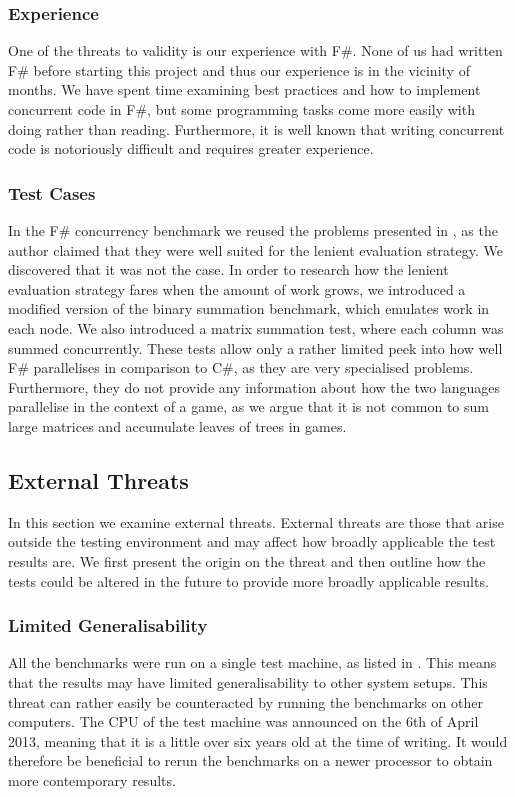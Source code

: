 \subsubsection{Experience}
One of the threats to validity is our experience with F\#. None of us had written F\# before starting this project and thus our experience is in the vicinity of months. We have spent time examining best practices and how to implement concurrent code in F\#, but some programming tasks come more easily with doing rather than reading. Furthermore, it is well known that writing concurrent code is notoriously difficult and requires greater experience\cite{nanz2013benchmarking,nanz2013examining}. 

\subsubsection{Test Cases}
In the F\# concurrency benchmark we reused the problems presented in \cite{DBLP:journals/cl/Tremblay-parallel}, as the author claimed that they were well suited for the lenient evaluation strategy. We discovered that it was not the case. In order to research how the lenient evaluation strategy fares when the amount of work grows, we introduced a modified version of the binary summation benchmark, which emulates work in each node. We also introduced a matrix summation test, where each column was summed concurrently. These tests allow only a rather limited peek into how well F\# parallelises in comparison to C\#, as they are very specialised problems. Furthermore, they do not provide any information about how the two languages parallelise in the context of a game, as we argue that it is not common to sum large matrices and accumulate leaves of trees in games.

\subsection{External Threats}
In this section we examine external threats. External threats are those that arise outside the testing environment and may affect how broadly applicable the test results are. We first present the origin on the threat and then outline how the tests could be altered in the future to provide more broadly applicable results.

\subsubsection{Limited Generalisability}
All the benchmarks were run on a single test machine, as listed in . This means that the results may have limited generalisability to other system setups. This threat can rather easily be counteracted by running the benchmarks on other computers. The \gls{CPU} of the test machine was announced on the 6th of April 2013\cite{i7:specs}, meaning that it is a little over six years old at the time of writing. It would therefore be beneficial to rerun the benchmarks on a newer processor to obtain more contemporary results. 